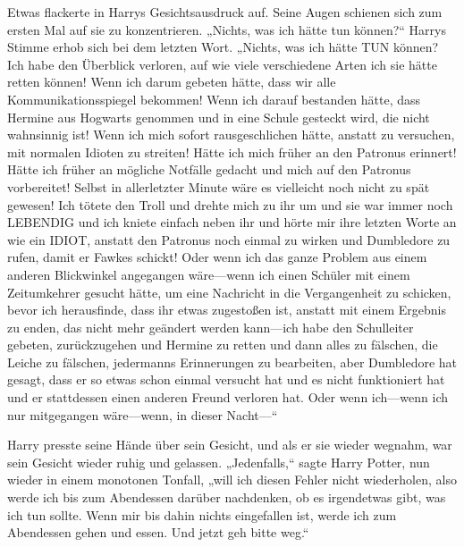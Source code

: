 Etwas flackerte in Harrys Gesichtsausdruck auf. Seine Augen schienen sich zum ersten Mal auf sie zu konzentrieren. „Nichts, was ich hätte tun können?“ Harrys Stimme erhob sich bei dem letzten Wort. „Nichts, was ich hätte TUN können? Ich habe den Überblick verloren, auf wie viele verschiedene Arten ich sie hätte retten können! Wenn ich darum gebeten hätte, dass wir alle Kommunikationsspiegel bekommen! Wenn ich darauf bestanden hätte, dass Hermine aus Hogwarts genommen und in eine Schule gesteckt wird, die nicht wahnsinnig ist! Wenn ich mich sofort rausgeschlichen hätte, anstatt zu versuchen, mit normalen Idioten zu streiten! Hätte ich mich früher an den Patronus erinnert! Hätte ich früher an mögliche Notfälle gedacht und mich auf den Patronus vorbereitet! Selbst in allerletzter Minute wäre es vielleicht noch nicht zu spät gewesen! Ich tötete den Troll und drehte mich zu ihr um und sie war immer noch LEBENDIG und ich kniete einfach neben ihr und hörte mir ihre letzten Worte an wie ein IDIOT, anstatt den Patronus noch einmal zu wirken und Dumbledore zu rufen, damit er Fawkes schickt! Oder wenn ich das ganze Problem aus einem anderen Blickwinkel angegangen wäre—wenn ich einen Schüler mit einem Zeitumkehrer gesucht hätte, um eine Nachricht in die Vergangenheit zu schicken, bevor ich herausfinde, dass ihr etwas zugestoßen ist, anstatt mit einem Ergebnis zu enden, das nicht mehr geändert werden kann—ich habe den Schulleiter gebeten, zurückzugehen und Hermine zu retten und dann alles zu fälschen, die Leiche zu fälschen, jedermanns Erinnerungen zu bearbeiten, aber Dumbledore hat gesagt, dass er so etwas schon einmal versucht hat und es nicht funktioniert hat und er stattdessen einen anderen Freund verloren hat. Oder wenn ich—wenn ich nur mitgegangen wäre—wenn, in dieser Nacht—“


Harry presste seine Hände über sein Gesicht, und als er sie wieder wegnahm, war sein Gesicht wieder ruhig und gelassen. „Jedenfalls,“ sagte Harry Potter, nun wieder in einem monotonen Tonfall, „will ich diesen Fehler nicht wiederholen, also werde ich bis zum Abendessen darüber nachdenken, ob es irgendetwas gibt, was ich tun sollte. Wenn mir bis dahin nichts eingefallen ist, werde ich zum Abendessen gehen und essen. Und jetzt geh bitte weg.“

